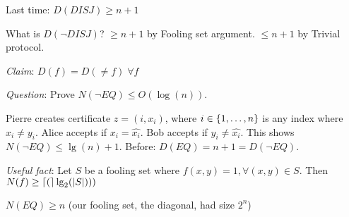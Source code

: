 Last time: $D(DISJ) \geq n + 1$

What is $D(\neg DISJ)$? $\geq n + 1$ by Fooling set argument. $\leq n + 1$ by Trivial protocol.

\emph{Claim}: $D(f) = D(\neq f) \; \forall f$

\emph{Question}: Prove $N(\neg EQ) \leq O(\log(n))$.

Pierre creates certificate $z = (i, x_i)$, where $i \in \left \{ 1, \ldots, n \right \}$ is any index where $x_i \neq y_i$. Alice accepts if $x_i = \hat{x_i}$. Bob accepts if $y_i \neq \hat{x_i}$. This shows $N(\neg EQ) \leq \lg(n) + 1$. Before: $D(EQ) = n + 1 = D(\neg EQ)$.

\emph{Useful fact}: Let $S$ be a fooling set  where $f(x, y) = 1, \forall (x, y) \in S$. Then $N(f) \geq \left \lceil ( \right \rceil\lg_2(\left | S \right |)))$

\begin{example}
    $N(EQ) \geq n$ (our fooling set, the diagonal, had size $2^n$)
\end{example}
